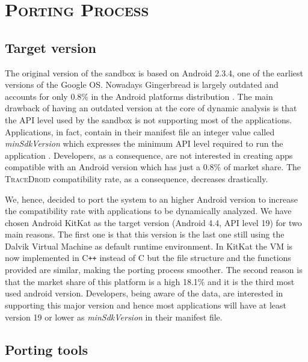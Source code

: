 \section{\textsc{Porting Process}}
\label{sec:porting_process}

\subsection{Target version}
\label{sec:target_version}

The original version of the sandbox is based on Android 2.3.4, one of
the earliest versions of the Google OS. Nowadays Gingerbread is
largely outdated and accounts for only 0.8\% in the Android platforms
distribution \cite{ref16}. The main drawback of having an outdated version at
the core of dynamic analysis is that the API level used by the sandbox
is not supporting most of the applications. Applications, in fact,
contain in their manifest file an integer value called \textit{minSdkVersion}
which expresses the minimum API level required to run the application
\cite{ref17}. Developers, as a consequence, are not interested in creating
apps compatible with an Android version which has just a 0.8\% of
market share. The \textsc{TraceDroid} compatibility rate, as a consequence,
decreases drastically.

We, hence, decided to port the system to an higher Android version to
increase the compatibility rate with applications to be dynamically
analyzed. We have chosen Android KitKat as the target version (Android
4.4, API level 19) for two main reasons. The first one is that this
version is the last one still using the Dalvik Virtual Machine as
default runtime environment. In KitKat the VM is now implemented in
C{}\verb!++! instead of C but the file structure and the functions provided are
similar, making the porting process smoother. The second reason is
that the market share of this platform is a high 18.1\% and it is the
third most used android version. Developers, being aware of the data,
are interested in supporting this major version and hence most
applications will have at least version 19 or lower as \textit{minSdkVersion}
in their manifest file.

\subsection{Porting tools}
\label{sec:porting_tools}

